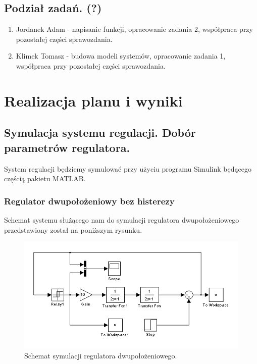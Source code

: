 \documentclass[a4paper,10pt]{article}
\begin{document}
\subsection{Podział zadań. (?)} 
\begin{enumerate}
		\item Jordanek Adam - napisanie funkcji, opracowanie zadania 2, współpraca przy pozostałej części sprawozdania.
		\item Klimek Tomasz - budowa modeli systemów, opracowanie zadania 1, współpraca przy pozostałej części sprawozdania.
\end{enumerate}

\newpage
\section{Realizacja planu i wyniki}
\subsection{Symulacja systemu regulacji. Dobór parametrów regulatora.}\label{sec:zad1}

System regulacji będziemy symulować przy użyciu programu Simulink będącego częścią pakietu M\small ATLAB.\normalsize

\subsubsection{Regulator dwupołożeniowy bez histerezy}\label{sec:r2bh}

Schemat systemu służącego nam do symulacji regulatora dwupołożeniowego przedstawiony został na poniższym rysunku.

\begin{figure}[!h]
    \centering
	\includegraphics[width=120mm]{CW3-schemat-2.png}
	\caption{Schemat symulacji regulatora dwupołożeniowego.}
    \label{fig:Rysunek}
\end{figure}
\end{document}
